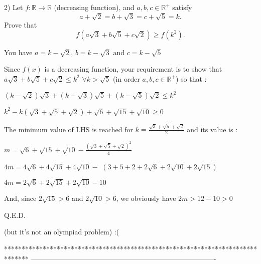 


\begin{solution}
	\begin{tcolorbox} 2) Let $ f: \mathbb{R} \to \mathbb{R}$ (decreasing function), and $ a,b,c \in \mathbb{R}^ +$ satisfy
\[ a + \sqrt 2 = b + \sqrt 3 = c + \sqrt 5 = k.
\]
Prove that
\[ f\left(a\sqrt 3 + b\sqrt 5 + c\sqrt 2 \right) \ge f(k^2).
\]
\end{tcolorbox}

You have $ a=k-\sqrt 2$, $ b= k- \sqrt 3$ and $ c = k - \sqrt 5$

Since $ f(x)$ is a decreasing function, your requirement is to show that $ a\sqrt3 + b\sqrt 5 + c\sqrt 2\leq k^2$ $ \forall k>\sqrt 5$ (in order $ a,b,c\in\mathbb R^+$) so that :

$ (k - \sqrt 2)\sqrt 3 + (k - \sqrt 3)\sqrt 5 + (k - \sqrt 5)\sqrt 2 \leq k^2$

$ k^2 - k(\sqrt 3 + \sqrt 5 + \sqrt 2) + \sqrt 6 + \sqrt{15} + \sqrt{10} \geq 0$

The  minimum value of LHS is reached for $ k=\frac{\sqrt 3 + \sqrt 5 + \sqrt 2}{2}$ and its value is :

$ m=\sqrt 6 + \sqrt{15} + \sqrt{10} - \frac{(\sqrt 3 + \sqrt 5 + \sqrt 2)^2}{4}$

$ 4m=4\sqrt 6 + 4\sqrt{15} + 4\sqrt{10} -$ $ (3 + 5 + 2 + 2\sqrt 6 + 2\sqrt {10} + 2\sqrt {15})$

$ 4m=2\sqrt 6 + 2\sqrt{15} + 2\sqrt{10} - 10$

And, since $ 2\sqrt{15} > 6$ and $ 2\sqrt{10} > 6$, we obviously have $ 2m > 12 - 10 > 0$

Q.E.D.

(but it's not an olympiad problem) :(
\end{solution}
*******************************************************************************
-------------------------------------------------------------------------------

